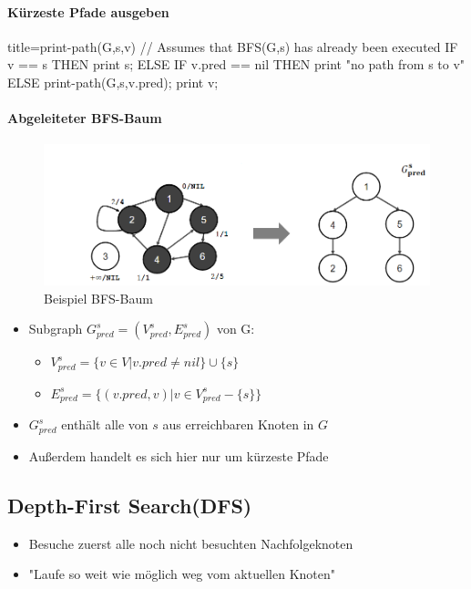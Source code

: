 \documentclass[
    ngerman,
    color=3b,
    dark_mode,
    load_common, %
    summary,
    boxarc,
]{tuda_summary}
\begin{document}
\pagebreak

\paragraph{Kürzeste Pfade ausgeben}\mbox{}
\begin{codeBlock}[autogobble]{title={print-path(G,s,v) // Assumes that BFS(G,s) has already been executed}}
IF v == s THEN
    print s;
ELSE
    IF v.pred == nil THEN
        print "no path from s to v"
    ELSE
        print-path(G,s,v.pred);
        print v;
\end{codeBlock}

\paragraph{Abgeleiteter BFS-Baum}\mbox{}
\begin{figure}[h]
    \centering
    \includegraphics[width=14cm]{pictures/bfsBaum.PNG}
    \caption{Beispiel BFS-Baum}
\end{figure}
\begin{itemize}
    \item Subgraph $G^s_{pred} = (V^s_{pred},E^s_{pred})$ von G:
          \begin{itemize}
              \item $V^s_{pred} = \{v \in V | v.pred \neq nil\} \cup \{s\}$
              \item $E^s_{pred} = \{(v.pred,v) | v \in V^s_{pred} - \{s\}\}$
          \end{itemize}
    \item $G^s_{pred}$ enthält alle von $s$ aus erreichbaren Knoten in $G$
    \item Au\ss{}erdem handelt es sich hier nur um kürzeste Pfade
\end{itemize}
\clearpage

\subsection{Depth-First Search(DFS)}
\begin{idea}
    \begin{itemize}
        \item Besuche zuerst alle noch nicht besuchten Nachfolgeknoten
        \item \string"Laufe so weit wie möglich weg vom aktuellen Knoten\string"
    \end{itemize}
\end{idea}
\end{document}
